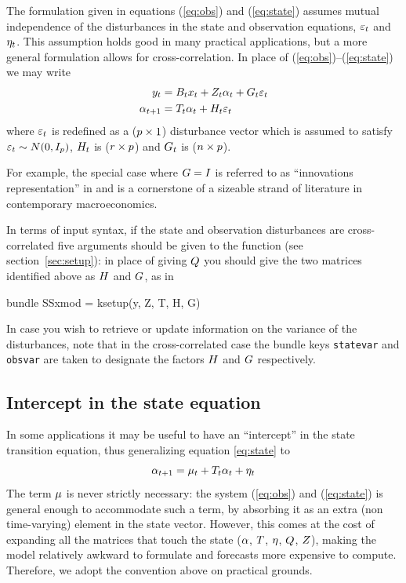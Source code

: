 The formulation given in equations (\ref{eq:obs}) and (\ref{eq:state})
assumes mutual independence of the disturbances in the state and
observation equations, $\varepsilon_t$ and $\eta_t$.  This assumption
holds good in many practical applications, but a more general
formulation allows for cross-correlation.  In place of
(\ref{eq:obs})--(\ref{eq:state}) we may write
%
\begin{align*}
  y_t &= B_tx_t + Z_t \alpha_t +
     G_t \varepsilon_t \\
  \alpha_{t+1} &= T_t \alpha_t +
     H_t \varepsilon_t
\end{align*}
%
where $\varepsilon_t$ is redefined as a ($p \times 1$) disturbance
vector which is assumed to satisfy $\varepsilon_t \sim N(0, I_{p})$,
$H_t$ is ($r \times p$) and $G_t$ is
($n \times p$).

For example, the special case where $G = I$ is referred to as
``innovations representation'' in \cite{hansen-sargent2013} and is a
cornerstone of a sizeable strand of literature in contemporary
macroeconomics.

In terms of input syntax, if the state and observation disturbances
are cross-correlated five arguments should be given to the
 function (see section~\ref{sec:setup}): in place of
giving $Q$ you should give the two matrices identified above as
$H$ and $G$, as in
\begin{code}
bundle SSxmod = ksetup(y, Z, T, H, G)
\end{code}

In case you wish to retrieve or update information on the variance of
the disturbances, note that in the cross-correlated case the bundle
keys \texttt{statevar} and \texttt{obsvar} are taken to designate the
factors $H$ and $G$ respectively.

\subsection{Intercept in the state equation}
\label{sec:stconst}

In some applications it may be useful to have an ``intercept'' in the
state transition equation, thus generalizing equation \eqref{eq:state}
to
\[
  \alpha_{t+1} = \mu_t + T_t \alpha_t + \eta_t \\
\]
The term $\mu$ is never strictly necessary: the system
(\ref{eq:obs}) and (\ref{eq:state}) is general enough to accommodate
such a term, by absorbing it as an extra (non time-varying) element in
the state vector.  However, this comes at the cost of expanding all
the matrices that touch the state ($\alpha$, $T$,
$\eta$, $Q$, $Z$), making the model relatively
awkward to formulate and forecasts more expensive to
compute. Therefore, we adopt the convention above on practical
grounds.

